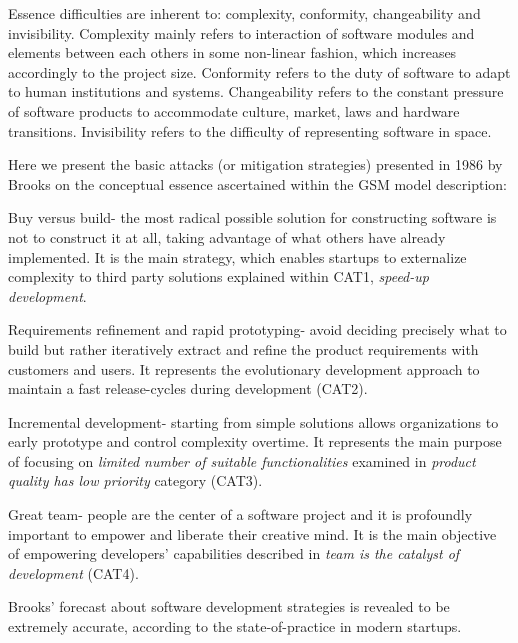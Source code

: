 \documentclass[10pt,journal,letterpaper,compsoc]{IEEEtran}
\begin{document}
Essence difficulties are inherent to: complexity, conformity, changeability and invisibility. Complexity  mainly refers to interaction of software modules and elements between each others in some non-linear fashion, which increases accordingly to the project size. Conformity refers to the duty of software to adapt to human institutions and systems. Changeability  refers to the constant pressure of software products to accommodate culture, market, laws and hardware transitions. Invisibility  refers to the difficulty of representing software in space. 

Here we present the basic attacks (or mitigation strategies) presented in 1986 by Brooks on the conceptual essence ascertained within the GSM model description:


\begin{compactitem}

\item Buy versus build-  the most radical possible solution for constructing software is not to construct it at all, taking advantage of what others have already implemented. It is the main strategy, which enables startups to externalize complexity to third party solutions explained within CAT1,  \textit{speed-up development}.
\item Requirements refinement and rapid prototyping- avoid deciding precisely what to build but rather iteratively extract and refine the product requirements with customers and users. It represents the evolutionary development approach to maintain a fast release-cycles during development (CAT2).
\item Incremental development- starting from simple solutions allows organizations to early prototype and control complexity overtime. It represents the main purpose of focusing on \textit{limited number of suitable functionalities} examined in \textit{product quality has low priority}  category (CAT3).
\item Great team- people are the center of a software project and it is profoundly important to empower and liberate their creative mind. It is the main objective of empowering developers' capabilities described in \textit{team is the catalyst of development} (CAT4).
\end{compactitem}

Brooks' forecast about software development strategies is revealed to be extremely accurate, according to the state-of-practice in modern startups.
\end{document}
